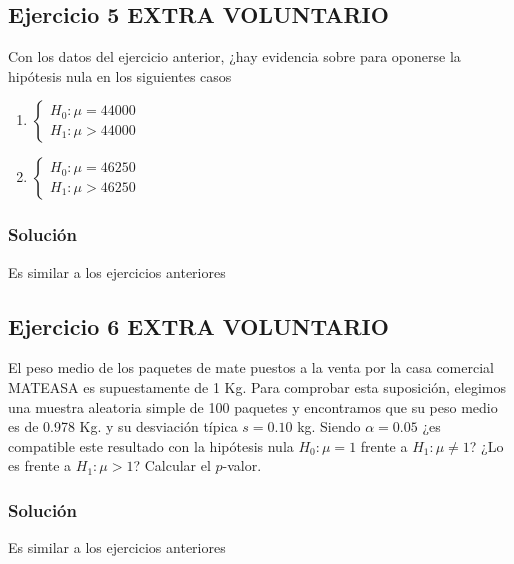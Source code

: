 \documentclass[
]{article}
\providecommand{\tightlist}{%
  \setlength{\itemsep}{0pt}\setlength{\parskip}{0pt}}
\begin{document}
\hypertarget{ejercicio-5-extra-voluntario}{%
\subsection{Ejercicio 5 EXTRA
VOLUNTARIO}\label{ejercicio-5-extra-voluntario}}

Con los datos del ejercicio anterior, ¿hay evidencia sobre para oponerse
la hipótesis nula en los siguientes casos

\begin{enumerate}
\def\labelenumi{\arabic{enumi}.}
\tightlist
\item
  \(\left\{\begin{array}{ll} H_{0}:\mu=44000\\ H_{1}:\mu>44000\end{array}\right.\)
\item
  \(\left\{\begin{array}{ll} H_{0}:\mu=46250\\ H_{1}:\mu>46250\end{array}\right.\)
\end{enumerate}

\hypertarget{soluciuxf3n-4}{%
\subsubsection{Solución}\label{soluciuxf3n-4}}

Es similar a los ejercicios anteriores

\hypertarget{ejercicio-6-extra-voluntario}{%
\subsection{Ejercicio 6 EXTRA
VOLUNTARIO}\label{ejercicio-6-extra-voluntario}}

El peso medio de los paquetes de mate puestos a la venta por la casa
comercial MATEASA es supuestamente de 1 Kg. Para comprobar esta
suposición, elegimos una muestra aleatoria simple de 100 paquetes y
encontramos que su peso medio es de 0.978 Kg. y su desviación típica
\(s=0.10\) kg. Siendo \(\alpha=0.05\) ¿es compatible este resultado con
la hipótesis nula \(H_{0}:\mu=1\) frente a \(H_{1}:\mu\not=1\)? ¿Lo es
frente a \(H_{1}:\mu>1\)? Calcular el \(p\)-valor.

\hypertarget{soluciuxf3n-5}{%
\subsubsection{Solución}\label{soluciuxf3n-5}}

Es similar a los ejercicios anteriores
\end{document}
